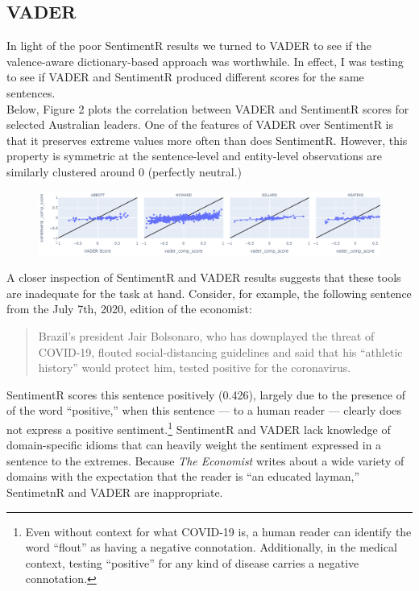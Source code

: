 \documentclass[11pt, letterpaper, twoside]{article}
\begin{document}
    \subsection{VADER}
        In light of the poor SentimentR results we turned to VADER to see if the valence-aware dictionary-based approach was worthwhile. In effect, I was testing to see if VADER and SentimentR produced different scores for the same sentences.\\

        Below, Figure 2 plots the correlation between VADER and SentimentR scores for selected Australian leaders. One of the features of VADER over SentimentR is that it preserves extreme values more often than does SentimentR. However, this property is symmetric at the sentence-level and entity-level observations are similarly clustered around 0 (perfectly neutral.)

        \begin{figure}[b]
            \includegraphics[width=\textwidth]{figures/AUS_VADER_SentimentR_Corels.png}
        \end{figure}

        A closer inspection of SentimentR and VADER results suggests that these tools are inadequate for the task at hand. Consider, for example, the following sentence from the July 7th, 2020, edition of the economist:
        \begin{quote}
            \singlespacing
            Brazil's president Jair Bolsonaro, who has downplayed the threat of COVID-19, flouted social-distancing guidelines and said that his ``athletic history'' would protect him, tested positive for the coronavirus.
        \end{quote} 
        
        SentimentR scores this sentence positively (0.426), largely due to the presence of of the word ``positive,'' when this sentence --- to a human reader --- clearly does not express a positive sentiment.\footnote{Even without context for what COVID-19 is, a human reader can identify the word ``flout'' as having a negative connotation. Additionally, in the medical context, testing ``positive'' for any kind of disease carries a negative connotation.} SentimentR and VADER lack knowledge of domain-specific idioms that can heavily weight the sentiment expressed in a sentence to the extremes. Because \textit{The Economist} writes about a wide variety of domains with the expectation that the reader is ``an educated layman,'' SentimetnR and VADER are inappropriate.
\end{document}
